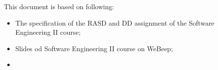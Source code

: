 This document is based on following:
\begin{itemize}
    \item The specification of the RASD and DD assignment of the Software Engineering II course;
    \item Slides od Software Engineering II course on WeBeep;
    \item 
\end{itemize}